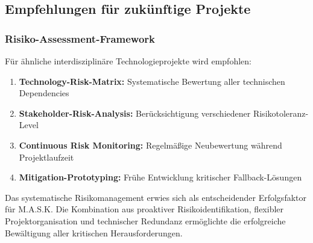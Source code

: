 \subsection{Empfehlungen für zukünftige Projekte}

\subsubsection{Risiko-Assessment-Framework}
Für ähnliche interdisziplinäre Technologieprojekte wird empfohlen:

\begin{enumerate}
    \item \textbf{Technology-Risk-Matrix:} Systematische Bewertung aller technischen Dependencies
    \item \textbf{Stakeholder-Risk-Analysis:} Berücksichtigung verschiedener Risikotoleranz-Level
    \item \textbf{Continuous Risk Monitoring:} Regelmäßige Neubewertung während Projektlaufzeit
    \item \textbf{Mitigation-Prototyping:} Frühe Entwicklung kritischer Fallback-Lösungen
\end{enumerate}

Das systematische Risikomanagement erwies sich als entscheidender Erfolgsfaktor für M.A.S.K. Die Kombination aus proaktiver Risikoidentifikation, flexibler Projektorganisation und technischer Redundanz ermöglichte die erfolgreiche Bewältigung aller kritischen Herausforderungen.